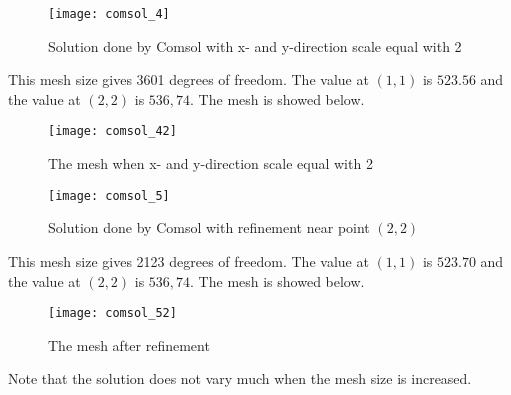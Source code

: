 \documentclass[11pt,a4paper,roman]{scrartcl}
\begin{document}
\begin{figure}[H]
\texttt{[image: comsol\_4]}
\caption{Solution done by Comsol with x- and y-direction scale equal with 2}
\end{figure}
This mesh size gives 3601 degrees of freedom. The value at $(1,1)$ is $523.56$ and the value at $(2,2)$ is $536,74$. The mesh is showed below. 

\begin{figure}[H]
\texttt{[image: comsol\_42]}
\caption{The mesh when x- and y-direction scale equal with 2}
\end{figure}


\begin{figure}[H]
\texttt{[image: comsol\_5]}
\caption{Solution done by Comsol with refinement near point $(2,2)$}
\end{figure}
This mesh size gives 2123 degrees of freedom. The value at $(1,1)$ is $523.70$ and the value at $(2,2)$ is $536,74$. The mesh is showed below. 

\begin{figure}[H]
\texttt{[image: comsol\_52]}
\caption{The mesh after refinement}
\end{figure}

Note that the solution does not vary much when the mesh size is increased. 
\end{document}
